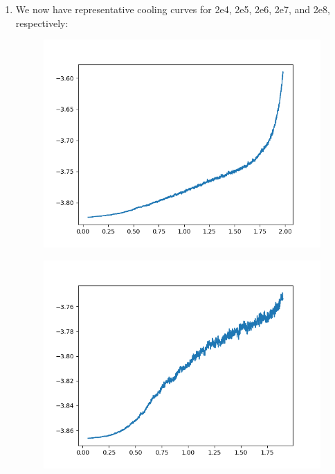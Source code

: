 \documentclass[12pt,reqno]{amsart}
\numberwithin{equation}{section}
\begin{document}
\begin{enumerate}
\item We now have representative cooling curves for 2e4, 2e5, 2e6, 2e7, and 2e8, respectively: 

\begin{figure}[H]
\centering
\includegraphics[scale=0.6]{average_cooling_data_N2e4}
\end{figure}

\begin{figure}[H]
\centering
\includegraphics[scale=0.6]{average_cooling_data_N2e5}
\end{figure}


\end{enumerate}
\end{document}
